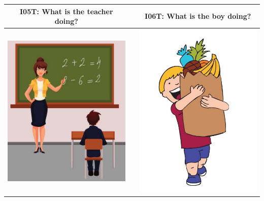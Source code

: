 \documentclass[12pt,notitlepage]{article}
\begin{document}
\begin{center}
\begin{tabular}{|c|c|c|}
\hline
I05T: What is the teacher doing? && I06T: What is the boy doing? \\
\hline
\includegraphics[width=20em,trim=0 0 0 -3]{figures/I05.jpg} & & \includegraphics[width=20em,trim=0 0 0 -3]{figures/I06.jpg} \\
\hline
\end{tabular}
\vspace{1em} \\



\end{center}
\end{document}
